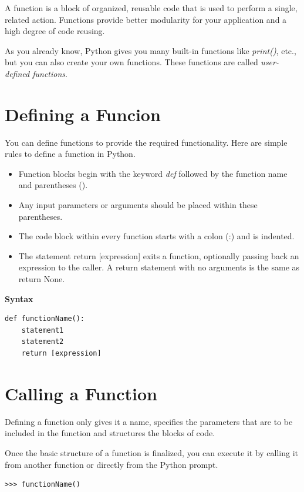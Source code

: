 \documentclass[11pt,a4paper]{article}
\author{TalentSprint}
\date{}
\begin{document}
A function is a block of organized, reusable code that is used to perform a single, related action.
Functions provide better modularity for your application and a high degree of code reusing.

As you already know, Python gives you many built-in functions like \emph{print()}, etc., but you can also create your own functions.
These functions are called \emph{user-defined functions}.

\section*{Defining a Funcion}

You can define functions to provide the required functionality. Here are simple rules to define a function in Python.
\begin{itemize}
\item Function blocks begin with the keyword \emph{def} followed by the function name and parentheses ().
\item Any input parameters or arguments should be placed within these parentheses. 
\item The code block within every function starts with a colon (:) and is indented.
\item The statement return [expression] exits a function, optionally passing back an expression to the caller. A return statement with no arguments is the same as return None.
\end{itemize}

\textbf{Syntax}
\begin{lstlisting}
def functionName():
    statement1
    statement2
    return [expression]
\end{lstlisting}

\section*{Calling a Function}
Defining a function only gives it a name, specifies the parameters that are to be included in the function and structures the blocks of code.

Once the basic structure of a function is finalized, you can execute it by calling it from another function or directly from the Python prompt.
\begin{verbatim}
>>> functionName()
\end{verbatim}
\end{document}
